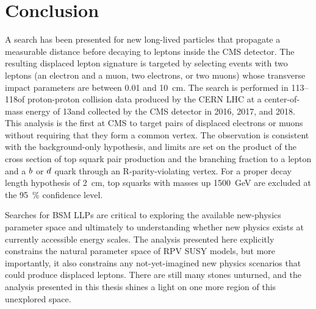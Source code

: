 \chapter{Conclusion}
\label{conclusion}
A search has been presented for new long-lived particles that propagate a measurable distance before decaying to leptons inside the CMS detector. The resulting displaced lepton signature is targeted by selecting events with two leptons (an electron and a muon, two electrons, or two muons) whose transverse impact parameters are between \num{0.01} and \SI{10}{\cm}. The search is performed in 113--118\fbinv of proton-proton collision data produced by the CERN LHC at a center-of-mass energy of 13\TeV and collected by the CMS detector in 2016, 2017, and 2018. This analysis is the first at CMS to target pairs of displaced electrons or muons without requiring that they form a common vertex. The observation is consistent with the background-only hypothesis, and limits are set on the product of the cross section of top squark pair production and the branching fraction to a lepton and a $b$ or $d$ quark through an R-parity-violating vertex. For a proper decay length hypothesis of \SI{2}{\cm}, top squarks with masses up \SI{1500}{\GeV} are excluded at the \SI{95}{\percent} confidence level.

Searches for BSM LLPs are critical to exploring the available new-physics parameter space and ultimately to understanding whether new physics exists at currently accessible energy scales. The analysis presented here explicitly constrains the natural parameter space of RPV SUSY models, but more importantly, it also constrains any not-yet-imagined new physics scenarios that could produce displaced leptons. There are still many stones unturned, and the analysis presented in this thesis shines a light on one more region of this unexplored space.

\pagebreak